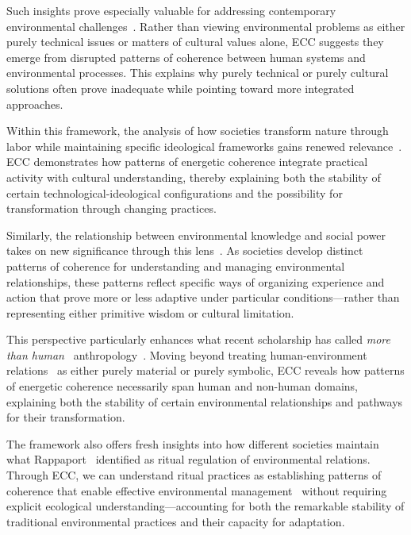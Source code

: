 Such insights prove especially valuable for addressing contemporary environmental challenges~\cite{tsing2015mushroom,palsson2015nature}. Rather than viewing environmental problems as either purely technical issues or matters of cultural values alone, ECC suggests they emerge from disrupted patterns of coherence between human systems and environmental processes. This explains why purely technical or purely cultural solutions often prove inadequate while pointing toward more integrated approaches.

Within this framework, the analysis of how societies transform nature through labor while maintaining specific ideological frameworks gains renewed relevance~\cite{bateson1972steps,bateson1979mind}. ECC demonstrates how patterns of energetic coherence integrate practical activity with cultural understanding, thereby explaining both the stability of certain technological-ideological configurations and the possibility for transformation through changing practices.

Similarly, the relationship between environmental knowledge and social power~ takes on new significance through this lens~\cite{tsing2015mushroom,povinelli2002cunning}. As societies develop distinct patterns of coherence for understanding and managing environmental relationships, these patterns reflect specific ways of organizing experience and action that prove more or less adaptive under particular conditions—rather than representing either primitive wisdom or cultural limitation.

This perspective particularly enhances what recent scholarship has called \textit{more than human}~ anthropology~\cite{kohn2013how,haraway2003companion}. Moving beyond treating human-environment relations~ as either purely material or purely symbolic, ECC reveals how patterns of energetic coherence necessarily span human and non-human domains, explaining both the stability of certain environmental relationships and pathways for their transformation.

The framework also offers fresh insights into how different societies maintain what Rappaport~\cite{rappaport1984pigs,rappaport1999ritual} identified as ritual regulation of environmental relations. Through ECC, we can understand ritual practices as establishing patterns of coherence that enable effective environmental management~ without requiring explicit ecological understanding—accounting for both the remarkable stability of traditional environmental practices and their capacity for adaptation.

